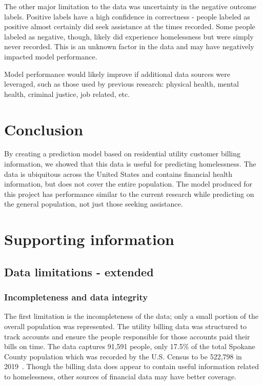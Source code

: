 \documentclass[10pt,letterpaper]{article}
\begin{document}
The other major limitation to the data was uncertainty in the negative outcome labels. Positive labels have a high confidence in correctness - people labeled as positive almost certainly did seek assistance at the times recorded. Some people labeled as negative, though, likely did experience homelessness but were simply never recorded. This is an unknown factor in the data and may have negatively impacted model performance.

Model performance would likely improve if additional data sources were leveraged, such as those used by previous research: physical health, mental health, criminal justice, job related, etc.

\section*{Conclusion}
By creating a prediction model based on residential utility customer billing information, we showed that this data is useful for predicting homelessness. The data is ubiquitous across the United States and contains financial health information, but does not cover the entire population. The model produced for this project has performance similar to the current research while predicting on the general population, not just those seeking assistance.

\section*{Supporting information}
\subsection*{Data limitations - extended}
\subsubsection*{Incompleteness and data integrity}
The first limitation is the incompleteness of the data; only a small portion of the overall population was represented. The utility billing data was structured to track accounts and ensure the people responsible for those accounts paid their bills on time. The data captures 91,591 people, only 17.5\% of the total Spokane County population which was recorded by the U.S. Census to be 522,798 in 2019~\cite{SpokanePop}. Though the billing data does appear to contain useful information related to homelessness, other sources of financial data may have better coverage.
\end{document}
